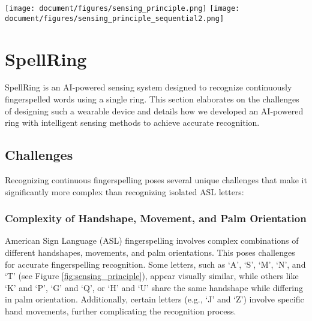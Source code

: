 

\begin{figure*}[htbp]
    \texttt{[image: document/figures/sensing\_principle.png]}
  \hfill
    \texttt{[image: document/figures/sensing\_principle\_sequential2.png]}
  \caption{Acoustic and IMU data over 26 isolated English/ASL alphabet letters and continuously fingerspelled words. Continuous fingerspelling adds complexity due to natural flow and quick transitions between letters, which alter sensor values depending on adjacent letters. }
  \label{fig:sensing_principle}
\end{figure*}



\section{SpellRing}

SpellRing is an AI-powered sensing system designed to recognize continuously fingerspelled words using a single ring. This section elaborates on the challenges of designing such a wearable device and details how we developed an AI-powered ring with intelligent sensing methods to achieve accurate recognition.


\subsection{Challenges}
Recognizing continuous fingerspelling poses several unique challenges that make it significantly more complex than recognizing isolated ASL letters:

\subsubsection{Complexity of Handshape, Movement, and Palm Orientation}
American Sign Language (ASL) fingerspelling involves complex combinations of different handshapes, movements, and palm orientations. This poses challenges for accurate fingerspelling recognition. Some letters, such as `A', `S', `M', `N', and `T' (see Figure \ref{fig:sensing_principle}), appear visually similar, while others like `K' and `P', `G' and `Q', or `H' and `U' share the same handshape while differing in palm orientation. Additionally, certain letters (e.g., `J' and `Z') involve specific hand movements, further complicating the recognition process.


